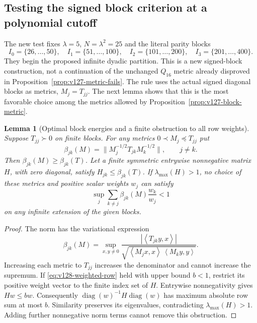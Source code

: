 \documentclass[11pt]{article}
\newtheorem{lemma}[theorem]{Lemma}
\theoremstyle{remark}
\newcommand{\ip}[2]{\left\langle #1,#2\right\rangle}
\begin{document}
\subsection*{Testing the signed block criterion at a polynomial cutoff}
\label{sec:v128-test}
The new test fixes $\lambda=5$, $N=\lambda^2=25$ and the literal
parity blocks
\[
 I_0=\{26,\ldots,50\},\quad I_1=\{51,\ldots,100\},\quad
 I_2=\{101,\ldots,200\},\quad I_3=\{201,\ldots,400\}.
\]
They begin the proposed infinite dyadic partition. This is a new
signed-block construction, not a continuation of the unchanged
$Q_{16}$ metric already disproved in Proposition~\ref{prop:v127-metric-fails}.
The rule uses the actual signed diagonal blocks as metrics,
$M_j=T_{jj}$. The next lemma shows that this is the most favorable
choice among the metrics allowed by Proposition~\ref{prop:v127-block-metric}.

\begin{lemma}[Optimal block energies and a finite obstruction to all row weights]
\label{lem:v128-comparison-obstruction}
Suppose $T_{jj}\succ0$ on finite blocks. For any metrics
$0\prec M_j\preceq T_{jj}$ put
\[
 \beta_{jk}(M)=\|M_j^{-1/2}T_{jk}M_k^{-1/2}\|,\qquad j\ne k.
\]
Then $\beta_{jk}(M)\ge\beta_{jk}(T)$. Let a finite symmetric
entrywise nonnegative matrix $H$, with zero diagonal, satisfy
$H_{jk}\le\beta_{jk}(T)$. If $\lambda_{\max}(H)>1$, no choice of
these metrics and positive scalar weights $w_j$ can satisfy
\begin{equation}\label{eq:v128-weighted-row}
 \sup_j\sum_{k\ne j}\beta_{jk}(M)\frac{w_k}{w_j}<1
\end{equation}
on any infinite extension of the given blocks.
\end{lemma}
\begin{proof}
The norm has the variational expression
\[
 \beta_{jk}(M)=\sup_{x,y\ne0}
 \frac{|\ip{T_{jk}y}{x}|}
 {\sqrt{\ip{M_jx}{x}\,\ip{M_ky}{y}}}.
\]
Increasing each metric to $T_{jj}$ increases the denominator and
cannot increase the supremum. If \eqref{eq:v128-weighted-row} held
with upper bound $b<1$, restrict its positive weight vector to the
finite index set of $H$. Entrywise nonnegativity gives $Hw\le bw$.
Consequently $\operatorname{diag}(w)^{-1}H\operatorname{diag}(w)$
has maximum absolute row sum at most $b$. Similarity preserves its
eigenvalues, contradicting $\lambda_{\max}(H)>1$. Adding further
nonnegative norm terms cannot remove this obstruction.
\end{proof}
\end{document}
